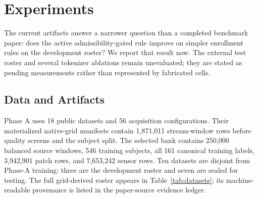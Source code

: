 \section{Experiments}
\label{sec:experiments}

The current artifacts answer a narrower question than a completed benchmark paper: does the active
admissibility-gated rule improve on simpler enrollment rules on the development roster? We report
that result now. The external test roster and several tokenizer ablations remain unevaluated; they
are stated as pending measurements rather than represented by fabricated cells.

\subsection{Data and Artifacts}
\label{sec:methodology}
\label{sec:datasets}

Phase A uses 18 public datasets and 56 acquisition configurations. Their materialized native-grid
manifests contain 1,871,011 stream-window rows before quality screens and the subject split. The
selected bank contains 250,000 balanced source windows, 546 training subjects, all 161 canonical
training labels, 3,942,901 patch rows, and 7,653,242 sensor rows. Ten datasets are disjoint from
Phase-A training: three are the development roster and seven are sealed for testing. The full
grid-derived roster appears in Table~\ref{tab:datasets}; its machine-readable provenance is listed
in the paper-source evidence ledger.

